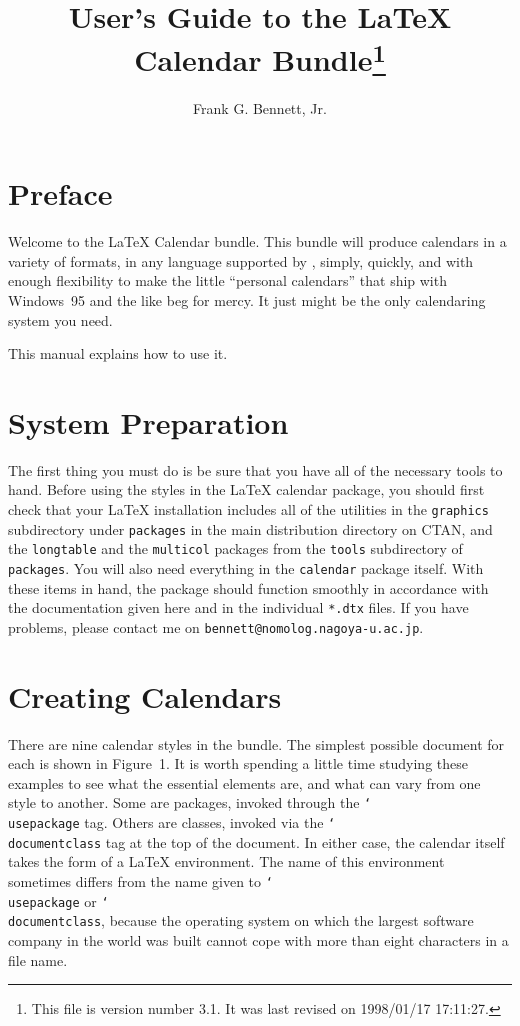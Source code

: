 \documentclass[a4paper]{article}
\def\fileversion{3.1}
\def\filedate{1998/01/17 17:11:27}
\DeclareRobustCommand\cs[1]{\texttt{\char`\\#1}}
\begin{document}
\title{User's Guide to the \LaTeX{} Calendar 
   Bundle\thanks{This file is version number
   \fileversion{}.  It was last revised on
   \filedate{}.}}

\author{Frank G. Bennett, Jr.}

\maketitle
\thispagestyle{empty}

\tableofcontents
\newpage

\setcounter{page}{1}

\section*{Preface}

Welcome to the \LaTeX{} Calendar bundle.  This bundle will
produce calendars in a variety of formats, in any language
supported by \LaTeXe, simply, quickly, and with enough
flexibility to make the little ``personal calendars'' that ship
with Windows~95 and the like beg for mercy.  It just might be the 
only calendaring system you need.

This manual explains how to use it.

\section{System Preparation}

The first thing you must do is be sure that you have all of the
necessary tools to hand.  Before using the styles in the \LaTeX{}
calendar package, you should first check that your \LaTeX{}
installation includes all of the utilities in the
\texttt{graphics} subdirectory under \texttt{packages} in the
main \LaTeXe{} distribution directory on CTAN, and the
\texttt{longtable} and the \texttt{multicol} packages from the
\texttt{tools} subdirectory of \texttt{packages}.  You will also
need everything in the \texttt{calendar} package itself. With
these items in hand, the package should function smoothly in
accordance with the documentation given here and in the
individual \texttt{*.dtx} files.  If you have problems, please
contact me on \texttt{bennett@nomolog.nagoya-u.ac.jp}.

\section{Creating Calendars}

There are nine calendar styles in the bundle.  The simplest
possible document for each is shown in Figure~1.  It is worth
spending a little time studying these examples to see what the
essential elements are, and what can vary from one style to
another.  Some are packages, invoked through the \cs{usepackage}
tag.  Others are classes, invoked via the \cs{documentclass} tag
at the top of the document.  In either case, the calendar itself
takes the form of a \LaTeX{} environment.  The name of this
environment sometimes differs from the name given to
\cs{usepackage} or \cs{documentclass}, because the operating
system on which the largest software company in the world was
built cannot cope with more than eight characters in a file name.
\end{document}
